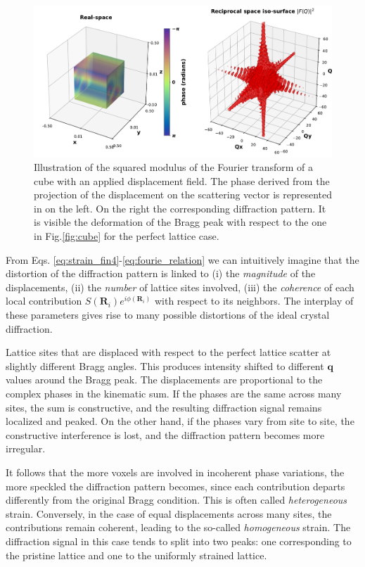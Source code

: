 \begin{figure}[H]
    \centering
    \includegraphics[width=\textwidth]{figures/Intro/cube_hihgstrain.pdf}
    \caption{Illustration of the squared modulus of the Fourier transform of a cube with an applied displacement field. 
    The phase derived from the projection of the displacement on the scattering vector is represented in on the left. On the 
    right the corresponding diffraction pattern. It is visible the deformation of the Bragg peak with respect to the 
    one in Fig.\ref{fig:cube} for the perfect lattice case. }
    \label{fig:cube_strain}
\end{figure}

From Eqs. \ref{eq:strain_fin4}-\ref{eq:fourie_relation} we can intuitively imagine that the distortion of the diffraction 
pattern is linked to (i) the \textit{magnitude} of the displacements, (ii) the \textit{number} of lattice sites involved, 
(iii) the \textit{coherence} of each local contribution $S(\mathbf{R}_i)e^{i\phi(\mathbf{R}_i)}$ with respect to its 
neighbors. The interplay of these parameters gives rise to many possible distortions of the ideal crystal diffraction.

Lattice sites that are displaced with respect to the perfect lattice scatter at slightly different Bragg angles. This 
produces intensity shifted to different $\mathbf{q}$ values around the Bragg peak. The displacements are 
proportional to the complex phases in the kinematic sum. If the phases are the same 
across many sites, the sum is constructive, and the resulting diffraction signal remains localized and peaked. On the 
other hand, if the phases vary from site to site, the constructive interference is lost, and the diffraction pattern 
becomes more irregular.

It follows that the more voxels are involved in incoherent phase variations, the more speckled the diffraction pattern 
becomes, since each contribution departs differently from the original Bragg condition. This is often called \textit{heterogeneous} 
strain. Conversely, in the case of equal displacements across many sites, the contributions remain coherent, leading to 
the so-called \textit{homogeneous} strain. The diffraction signal in this case tends to split into two peaks: one 
corresponding to the pristine lattice and one to the uniformly strained lattice.

